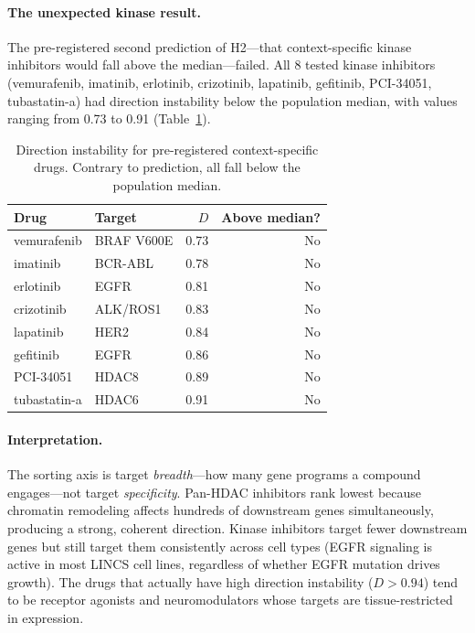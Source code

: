 \documentclass{article}
\begin{document}
\paragraph{The unexpected kinase result.}
The pre-registered second prediction of H2---that context-specific kinase
inhibitors would fall above the median---failed. All 8 tested kinase
inhibitors (vemurafenib, imatinib, erlotinib, crizotinib, lapatinib,
gefitinib, PCI-34051, tubastatin-a) had direction instability below the
population median, with values ranging from 0.73 to 0.91
(Table~\ref{tab:specific}).

\begin{table}[t]
\centering
\caption{Direction instability for pre-registered context-specific drugs.
Contrary to prediction, all fall below the population median.}
\label{tab:specific}
\small
\begin{tabular}{llrr}
\toprule
Drug & Target & $D$ & Above median? \\
\midrule
vemurafenib & BRAF V600E & 0.73 & No \\
imatinib & BCR-ABL & 0.78 & No \\
erlotinib & EGFR & 0.81 & No \\
crizotinib & ALK/ROS1 & 0.83 & No \\
lapatinib & HER2 & 0.84 & No \\
gefitinib & EGFR & 0.86 & No \\
PCI-34051 & HDAC8 & 0.89 & No \\
tubastatin-a & HDAC6 & 0.91 & No \\
\bottomrule
\end{tabular}
\end{table}

\paragraph{Interpretation.}
The sorting axis is target \emph{breadth}---how many gene programs a compound
engages---not target \emph{specificity}. Pan-HDAC inhibitors rank lowest
because chromatin remodeling affects hundreds of downstream genes
simultaneously, producing a strong, coherent direction. Kinase inhibitors
target fewer downstream genes but still target them consistently across cell
types (EGFR signaling is active in most LINCS cell lines, regardless of
whether EGFR mutation drives growth). The drugs that actually have high
direction instability ($D > 0.94$) tend to be receptor agonists and
neuromodulators whose targets are tissue-restricted in expression.
\end{document}
